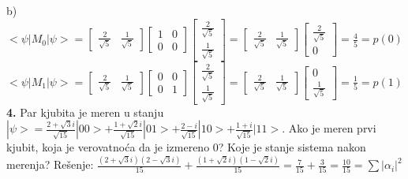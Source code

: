 \documentclass{article}
\begin{document}
b) $<\psi|M_0|\psi> = \begin{bmatrix}
    \frac{2}{\sqrt{5}} & \frac{1}{\sqrt{5}} 
\end{bmatrix}\begin{bmatrix}
    1 & 0\\
    0 & 0
\end{bmatrix}\begin{bmatrix}
    \frac{2}{\sqrt{5}}\\
    \frac{1}{\sqrt{5}}
\end{bmatrix} = \begin{bmatrix}
    \frac{2}{\sqrt{5}} & \frac{1}{\sqrt{5}} 
\end{bmatrix}\begin{bmatrix}
    \frac{2}{\sqrt{5}}\\
    0
\end{bmatrix} = \frac{4}{5} = p(0)$
\vspace{0.1cm}\newline
\hspace*{0.4cm}$<\psi|M_1|\psi> = \begin{bmatrix}
    \frac{2}{\sqrt{5}} & \frac{1}{\sqrt{5}} 
\end{bmatrix}\begin{bmatrix}
    0 & 0\\
    0 & 1
\end{bmatrix}\begin{bmatrix}
    \frac{2}{\sqrt{5}}\\
    \frac{1}{\sqrt{5}} 
\end{bmatrix} = \begin{bmatrix}
    \frac{2}{\sqrt{5}} & \frac{1}{\sqrt{5}} 
\end{bmatrix}\begin{bmatrix}
    0\\
   \frac{1}{\sqrt{5}} 
\end{bmatrix} = \frac{1}{5} = p(1)$
\vspace{0.4cm}\newline
\textbf{4.} Par kjubita je meren u stanju $|\psi> = \frac{2+\sqrt{3}i}{\sqrt{15}}|00> + \frac{1+\sqrt{2}i}{\sqrt{15}}|01> + \frac{2-i}{\sqrt{15}}|10> + \frac{1+i}{\sqrt{15}}|11>$. Ako je meren prvi kjubit, koja je verovatnoća da je izmereno 0? Koje je stanje sistema nakon merenja?
\vspace*{0.4cm}\newline
Rešenje: \vspace{0.2cm}\newline
$\frac{(2+\sqrt{3}i)(2-\sqrt{3}i)}{15} + \frac{(1+\sqrt{2}i)(1-\sqrt{2}i)}{15} = \frac{7}{15} + \frac{3}{15} = \frac{10}{15} = \sum|\alpha_i|^2$ \Rightarrow {}
\end{document}
